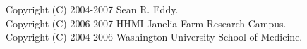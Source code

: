 \vspace*{\fill}
\begin{flushleft}
Copyright (C) 2004-2007 Sean R. Eddy.\\
Copyright (C) 2006-2007 HHMI Janelia Farm Research Campus.\\
Copyright (C) 2004-2006 Washington University School of Medicine.\\
\end{flushleft}


